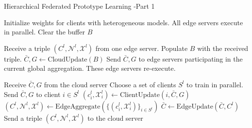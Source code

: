 \documentclass{article}
\begin{document}
\begin{algorithm}[H]
  \caption{Hierarchical Federated Prototype Learning -Part 1}
  \begin{algorithmic}[1]

    \State Initialize weights for clients with heterogeneous models.
    \State All edge servers execute in parallel.
    \State Clear the buffer \(B\)

     
    \State Receive a triple \( (C^l, \mathcal{N}^l, \mathcal{X}^l) \) from one edge server.
    \State Populate \( B \) with the received triple.
    \EndWhile
    \State \( \bar{C}, G \gets \text{CloudUpdate}(B) \)
    \State Send \( \bar{C}, G \) to edge servers participating in the current global aggregation.
    \State These edge servers re-execute.
    \EndFor
    \EndProcedure

    \State Receive \( \bar{C}, G \) from the cloud server
    \State Choose a set of clients $S^l$ to train in parallel.
     
    \State Send \( \bar{C}, G \) to client \( i \in S^{l} \)
    \State \( (c^l_i, \mathcal{X}^l_i) \gets \text{ClientUpdate}(i, \bar{C}, G) \)
    \EndFor {}
    \State \( (C^l, \mathcal{N}^l, \mathcal{X}^l) \gets \text{EdgeAggregate}(\{ (c^l_i, \mathcal{X}^l_i) \}_{i \in S^{l}}) \)
    \State \( \bar{C} \gets \text{EdgeUpdate}(\bar{C}, C^l) \) 
    \EndFor
    \State Send a triple \( (C^l, \mathcal{N}^l, \mathcal{X}^l) \) to the cloud server
    \EndProcedure
  \end{algorithmic}
\end{algorithm}

\end{document}
